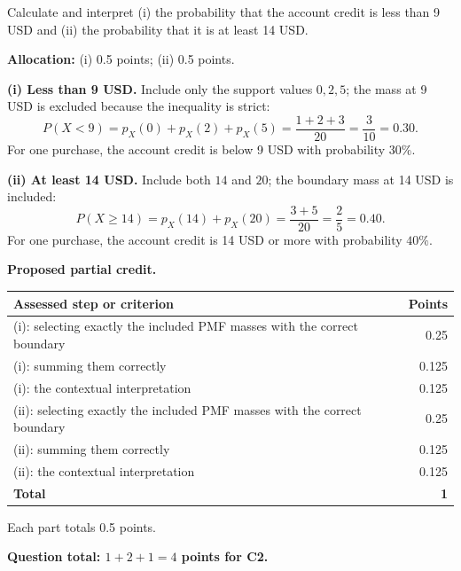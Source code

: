 Calculate and interpret (i) the probability that the account credit is less than 9 USD and (ii) the probability that it is at least 14 USD.

\textbf{Allocation:} (i) 0.5 points; (ii) 0.5 points.

\textbf{(i) Less than 9 USD.} Include only the support values $0,2,5$; the mass at 9 USD is excluded because the inequality is strict:
\[
P(X<9)=p_X(0)+p_X(2)+p_X(5)
=\frac{1+2+3}{20}=\frac3{10}=0.30.
\]
For one purchase, the account credit is below 9 USD with probability $30\%$.

\textbf{(ii) At least 14 USD.} Include both $14$ and $20$; the boundary mass at 14 USD is included:
\[
P(X\geq14)=p_X(14)+p_X(20)=\frac{3+5}{20}=\frac25=0.40.
\]
For one purchase, the account credit is 14 USD or more with probability $40\%$.

\par\smallskip
\noindent\begin{minipage}{\linewidth}
\textbf{Proposed partial credit.}\par\smallskip
\begin{tabularx}{\linewidth}{@{}>{\raggedright\arraybackslash}X r@{}}\toprule
\textbf{Assessed step or criterion} & \textbf{Points}\\\midrule
(i): selecting exactly the included PMF masses with the correct boundary & 0.25\\
(i): summing them correctly & 0.125\\
(i): the contextual interpretation & 0.125\\
(ii): selecting exactly the included PMF masses with the correct boundary & 0.25\\
(ii): summing them correctly & 0.125\\
(ii): the contextual interpretation & 0.125\\
\midrule
\textbf{Total} & \textbf{1}\\
\bottomrule\end{tabularx}
\end{minipage}\par\smallskip

Each part totals 0.5 points.

\par\vspace{3mm}\secInicio[][sec:q5]

\textbf{Question total: $1+2+1=4$ points for C2.}

\clearpage
{}

